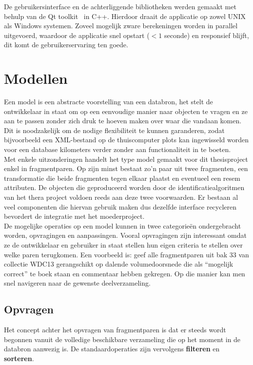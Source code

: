 De gebruikersinterface en de achterliggende bibliotheken werden gemaakt met behulp van de Qt toolkit~\cite{qtdoc} in C++. Hierdoor draait de applicatie op zowel UNIX als Windows systemen. Zoveel mogelijk zware berekeningen worden in parallel uitgevoerd, waardoor de applicatie snel opstart ($<1$ seconde) en responsief blijft, dit komt de gebruikerservaring ten goede.\\

\section{Modellen}
Een model is een abstracte voorstelling van een databron, het stelt de ontwikkelaar in staat om op een eenvoudige manier naar objecten te vragen en ze aan te passen zonder zich druk te hoeven maken over waar die vandaan komen. Dit is noodzakelijk om de nodige flexibiliteit te kunnen garanderen, zodat bijvoorbeeld een XML-bestand op de thuiscomputer plots kan ingewisseld worden voor een database kilometers verder zonder aan functionaliteit in te boeten.\\

Met enkele uitzonderingen handelt het type model gemaakt voor dit thesisproject enkel in fragmentparen. Op zijn minst bestaat zo'n paar uit twee fragmenten, een transformatie die beide fragmenten tegen elkaar plaatst en eventueel een resem attributen. De objecten die geproduceerd worden door de identificatiealgoritmen van het thera project voldoen reeds aan deze twee voorwaarden. Er bestaan al veel componenten die hiervan gebruik maken dus dezelfde interface recycleren bevordert de integratie met het moederproject.\\

De mogelijke operaties op een model kunnen in twee categorie\"en ondergebracht worden, opvragingen en aanpassingen. Vooral opvragingen zijn interessant omdat ze de ontwikkelaar en gebruiker in staat stellen hun eigen criteria te stellen over welke paren terugkomen. Een voorbeeld is: geef alle fragmentparen uit bak 33 van collectie WDC13 gerangschikt op dalende volumedoorsnede die als ``mogelijk correct'' te boek staan en commentaar hebben gekregen. Op die manier kan men snel navigeren naar de gewenste deelverzameling.

\subsection{Opvragen}
Het concept achter het opvragen van fragmentparen is dat er steeds wordt begonnen vanuit de volledige beschikbare verzameling die op het moment in de databron aanwezig is. De standaardoperaties zijn vervolgens \textbf{filteren} en \textbf{sorteren}. \\

